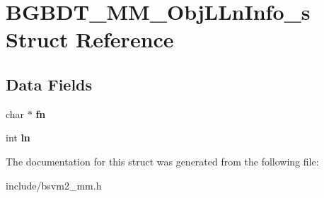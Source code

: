 \hypertarget{structBGBDT__MM__ObjLLnInfo__s}{\section{B\-G\-B\-D\-T\-\_\-\-M\-M\-\_\-\-Obj\-L\-Ln\-Info\-\_\-s Struct Reference}
\label{structBGBDT__MM__ObjLLnInfo__s}
}
\subsection*{Data Fields}
\begin{DoxyCompactItemize}
\item 
\hypertarget{structBGBDT__MM__ObjLLnInfo__s_a1ebde1f074ec908aae85fb17502388d0}{char $\ast$ {\bfseries fn}}\label{structBGBDT__MM__ObjLLnInfo__s_a1ebde1f074ec908aae85fb17502388d0}

\item 
\hypertarget{structBGBDT__MM__ObjLLnInfo__s_acff2f93ef5e7151863401c56156a5788}{int {\bfseries ln}}\label{structBGBDT__MM__ObjLLnInfo__s_acff2f93ef5e7151863401c56156a5788}

\end{DoxyCompactItemize}


The documentation for this struct was generated from the following file\-:\begin{DoxyCompactItemize}
\item 
include/bsvm2\-\_\-mm.\-h\end{DoxyCompactItemize}
